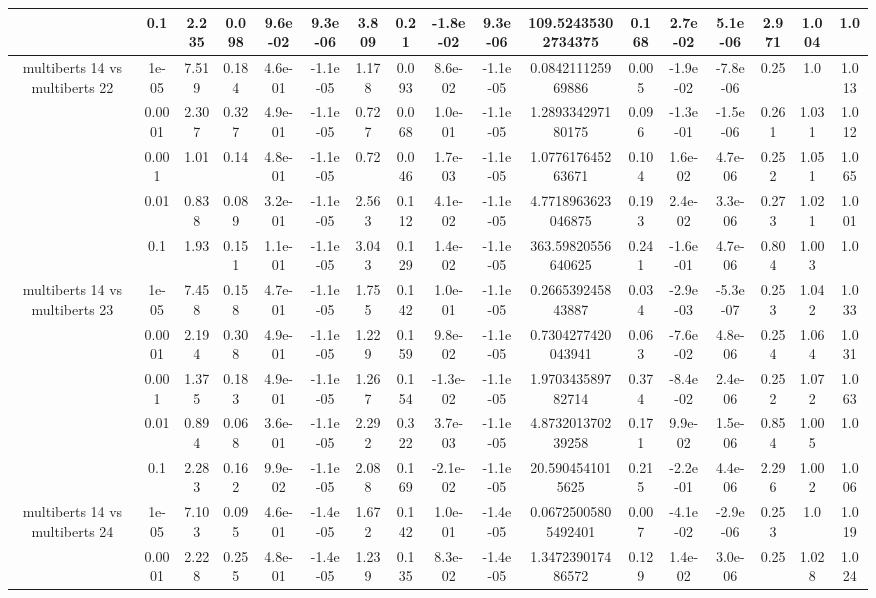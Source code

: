 \begin{tabular}{|c|c|c|c|c|c|c|c|c|c|c|c|c|c|c|c|c|}
 & 0.1 & 2.235 & 0.098 & 9.6e-02 & 9.3e-06 & 3.809 & 0.21 & -1.8e-02 & 9.3e-06 & 109.52435302734375 & 0.168 & 2.7e-02 & 5.1e-06 & 2.971 & 1.004 & 1.0 \\
\hline
\multirow{5}{*}{multiberts 14 vs multiberts 22} & 1e-05 & 7.519 & 0.184 & 4.6e-01 & -1.1e-05 & 1.178 & 0.093 & 8.6e-02 & -1.1e-05 & 0.084211125969886 & 0.005 & -1.9e-02 & -7.8e-06 & 0.25 & 1.0 & 1.013 \\
 & 0.0001 & 2.307 & 0.327 & 4.9e-01 & -1.1e-05 & 0.727 & 0.068 & 1.0e-01 & -1.1e-05 & 1.289334297180175 & 0.096 & -1.3e-01 & -1.5e-06 & 0.261 & 1.031 & 1.012 \\
 & 0.001 & 1.01 & 0.14 & 4.8e-01 & -1.1e-05 & 0.72 & 0.046 & 1.7e-03 & -1.1e-05 & 1.077617645263671 & 0.104 & 1.6e-02 & 4.7e-06 & 0.252 & 1.051 & 1.065 \\
 & 0.01 & 0.838 & 0.089 & 3.2e-01 & -1.1e-05 & 2.563 & 0.112 & 4.1e-02 & -1.1e-05 & 4.7718963623046875 & 0.193 & 2.4e-02 & 3.3e-06 & 0.273 & 1.021 & 1.001 \\
 & 0.1 & 1.93 & 0.151 & 1.1e-01 & -1.1e-05 & 3.043 & 0.129 & 1.4e-02 & -1.1e-05 & 363.59820556640625 & 0.241 & -1.6e-01 & 4.7e-06 & 0.804 & 1.003 & 1.0 \\
\hline
\multirow{5}{*}{multiberts 14 vs multiberts 23} & 1e-05 & 7.458 & 0.158 & 4.7e-01 & -1.1e-05 & 1.755 & 0.142 & 1.0e-01 & -1.1e-05 & 0.266539245843887 & 0.034 & -2.9e-03 & -5.3e-07 & 0.253 & 1.042 & 1.033 \\
 & 0.0001 & 2.194 & 0.308 & 4.9e-01 & -1.1e-05 & 1.229 & 0.159 & 9.8e-02 & -1.1e-05 & 0.7304277420043941 & 0.063 & -7.6e-02 & 4.8e-06 & 0.254 & 1.064 & 1.031 \\
 & 0.001 & 1.375 & 0.183 & 4.9e-01 & -1.1e-05 & 1.267 & 0.154 & -1.3e-02 & -1.1e-05 & 1.970343589782714 & 0.374 & -8.4e-02 & 2.4e-06 & 0.252 & 1.072 & 1.063 \\
 & 0.01 & 0.894 & 0.068 & 3.6e-01 & -1.1e-05 & 2.292 & 0.322 & 3.7e-03 & -1.1e-05 & 4.873201370239258 & 0.171 & 9.9e-02 & 1.5e-06 & 0.854 & 1.005 & 1.0 \\
 & 0.1 & 2.283 & 0.162 & 9.9e-02 & -1.1e-05 & 2.088 & 0.169 & -2.1e-02 & -1.1e-05 & 20.5904541015625 & 0.215 & -2.2e-01 & 4.4e-06 & 2.296 & 1.002 & 1.006 \\
\hline
\multirow{5}{*}{multiberts 14 vs multiberts 24} & 1e-05 & 7.103 & 0.095 & 4.6e-01 & -1.4e-05 & 1.672 & 0.142 & 1.0e-01 & -1.4e-05 & 0.06725005805492401 & 0.007 & -4.1e-02 & -2.9e-06 & 0.253 & 1.0 & 1.019 \\
 & 0.0001 & 2.228 & 0.255 & 4.8e-01 & -1.4e-05 & 1.239 & 0.135 & 8.3e-02 & -1.4e-05 & 1.347239017486572 & 0.129 & 1.4e-02 & 3.0e-06 & 0.25 & 1.028 & 1.024 \\

\end{tabular}
